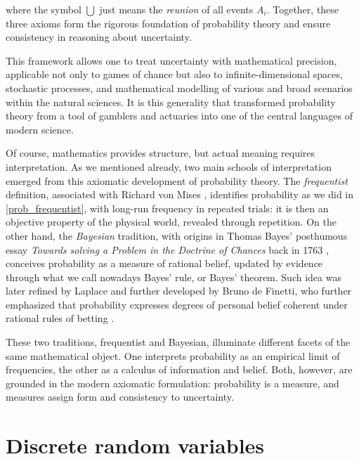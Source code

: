 \documentclass{book}
\begin{document}
where the symbol $\bigcup$ just means the \textit{reunion} of all events $A_i$. Together, these three axioms form the rigorous foundation of probability theory and ensure consistency in reasoning about uncertainty.

\medskip

This framework allows one to treat uncertainty with mathematical precision, applicable not only to games of chance but also to infinite-dimensional spaces, stochastic processes, and mathematical modelling of various and broad scenarios within the natural sciences. It is this generality that transformed probability theory from a tool of gamblers and actuaries into one of the central languages of modern science.

\medskip

Of course, mathematics provides structure, but actual meaning requires interpretation. As we mentioned already, two main schools of interpretation emerged from this axiomatic development of probability theory. The \textit{frequentist} definition, associated with Richard von Mises \cite{vonmises1928}, identifies probability as we did in \eqref{prob_frequentist}, with long-run frequency in repeated trials: it is then an objective property of the physical world, revealed through repetition. On the other hand, the \textit{Bayesian} tradition, with origins in Thomas Bayes’ posthumous essay \textit{Towards solving a Problem in the Doctrine of Chances} back in 1763 \cite{bayes1763}, conceives probability as a measure of rational belief, updated by evidence through what we call nowadays Bayes’ rule, or Bayes' theorem. Such idea was later refined by Laplace \cite{laplace1812} and further developed by Bruno de Finetti, who further emphasized that probability expresses degrees of personal belief coherent under rational rules of betting \cite{definetti1974}.

\medskip

These two traditions, frequentist and Bayesian, illuminate different facets of the same mathematical object. One interprets probability as an empirical limit of frequencies, the other as a calculus of information and belief. Both, however, are grounded in the modern axiomatic formulation: probability is a measure, and measures assign form and consistency to uncertainty.

\section{Discrete random variables}
\end{document}
